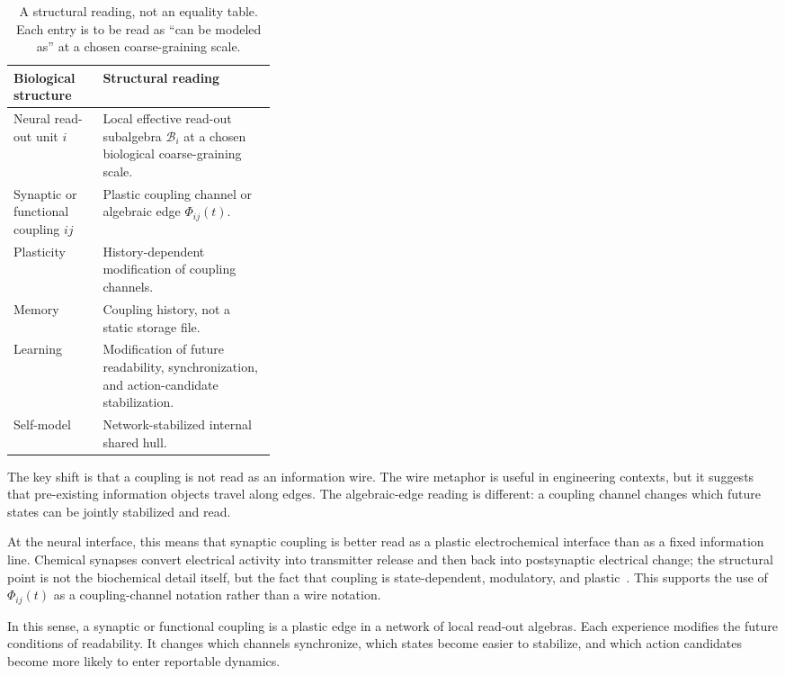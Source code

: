 \documentclass[12pt]{article}
\theoremstyle{definition}
\theoremstyle{remark}
\begin{document}
\begin{table}[H]
\centering
\begin{tabularx}{0.96\linewidth}{P{0.34\linewidth}Y}
\toprule
\textbf{Biological structure} & \textbf{Structural reading} \\
\midrule
Neural read-out unit \(i\) &
Local effective read-out subalgebra \(\mathcal B_i\) at a chosen biological coarse-graining scale. \\
Synaptic or functional coupling \(ij\) &
Plastic coupling channel or algebraic edge \(\Phi_{ij}(t)\). \\
Plasticity &
History-dependent modification of coupling channels. \\
Memory &
Coupling history, not a static storage file. \\
Learning &
Modification of future readability, synchronization, and action-candidate stabilization. \\
Self-model &
Network-stabilized internal shared hull. \\
\bottomrule
\end{tabularx}
\caption{A structural reading, not an equality table. Each entry is to be
read as ``can be modeled as'' at a chosen coarse-graining scale.}
\end{table}

The key shift is that a coupling is not read as an information wire. The
wire metaphor is useful in engineering contexts, but it suggests that
pre-existing information objects travel along edges. The algebraic-edge
reading is different: a coupling channel changes which future states can
be jointly stabilized and read.

At the neural interface, this means that synaptic coupling is better
read as a plastic electrochemical interface than as a fixed information
line. Chemical synapses convert electrical activity into transmitter
release and then back into postsynaptic electrical change; the
structural point is not the biochemical detail itself, but the fact that
coupling is state-dependent, modulatory, and plastic~\cite{Sudhof2012,Sudhof2013}.
This supports the use of \(\Phi_{ij}(t)\) as
a coupling-channel notation rather than a wire notation.

In this sense, a synaptic or functional coupling is a plastic edge in a
network of local read-out algebras. Each experience modifies the future
conditions of readability. It changes which channels synchronize, which
states become easier to stabilize, and which action candidates become
more likely to enter reportable dynamics.
\end{document}
